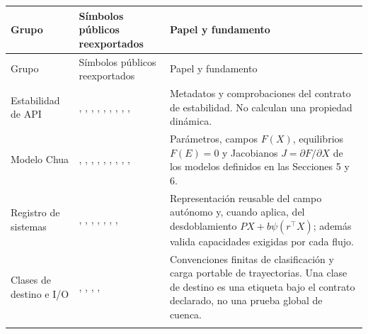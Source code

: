 \begin{center}
\footnotesize
\begin{longtable}{@{}L{0.16\textwidth}L{0.50\textwidth}L{0.28\textwidth}@{}}
\toprule
Grupo & Símbolos públicos reexportados & Papel y fundamento \\
\midrule
\endfirsthead
\toprule
Grupo & Símbolos públicos reexportados & Papel y fundamento \\
\midrule
\endhead
Estabilidad de API &
,
,
,
,
,
,
,
,
,
&
Metadatos y comprobaciones del contrato de estabilidad. No calculan una
propiedad dinámica. \\
\addlinespace

Modelo Chua &
,
,
,
,
,
,
,
,
,
&
Parámetros, campos \(F(X)\), equilibrios \(F(E)=0\) y Jacobianos
\(J=\partial F/\partial X\) de los modelos definidos en las Secciones 5 y 6. \\
\addlinespace

Registro de sistemas &
,
,
,
,
,
,
,
&
Representación reusable del campo autónomo y, cuando aplica, del
desdoblamiento \(PX+b\psi(r^\top X)\); además valida capacidades exigidas por
cada flujo. \\
\addlinespace

Clases de destino e I/O &
,
,
,
,
&
Convenciones finitas de clasificación y carga portable de trayectorias. Una
clase de destino es una etiqueta bajo el contrato declarado, no una prueba
global de cuenca. \\
\addlinespace


\end{longtable}
\end{center}
